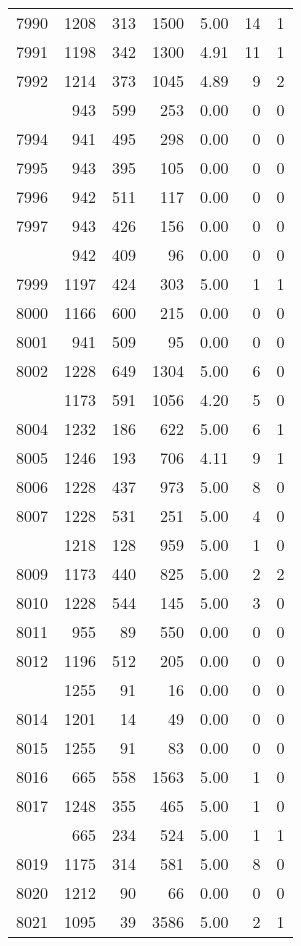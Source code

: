 \documentclass[
]{article}
\begin{document}
\begin{table}
\begin{tabular}[t]{lrrrrrr}
7990 & 1208 & 313 & 1500 & 5.00 & 14 & 1\\
7991 & 1198 & 342 & 1300 & 4.91 & 11 & 1\\
7992 & 1214 & 373 & 1045 & 4.89 & 9 & 2\\
\addlinespace
7993 & 943 & 599 & 253 & 0.00 & 0 & 0\\
7994 & 941 & 495 & 298 & 0.00 & 0 & 0\\
7995 & 943 & 395 & 105 & 0.00 & 0 & 0\\
7996 & 942 & 511 & 117 & 0.00 & 0 & 0\\
7997 & 943 & 426 & 156 & 0.00 & 0 & 0\\
\addlinespace
7998 & 942 & 409 & 96 & 0.00 & 0 & 0\\
7999 & 1197 & 424 & 303 & 5.00 & 1 & 1\\
8000 & 1166 & 600 & 215 & 0.00 & 0 & 0\\
8001 & 941 & 509 & 95 & 0.00 & 0 & 0\\
8002 & 1228 & 649 & 1304 & 5.00 & 6 & 0\\
\addlinespace
8003 & 1173 & 591 & 1056 & 4.20 & 5 & 0\\
8004 & 1232 & 186 & 622 & 5.00 & 6 & 1\\
8005 & 1246 & 193 & 706 & 4.11 & 9 & 1\\
8006 & 1228 & 437 & 973 & 5.00 & 8 & 0\\
8007 & 1228 & 531 & 251 & 5.00 & 4 & 0\\
\addlinespace
8008 & 1218 & 128 & 959 & 5.00 & 1 & 0\\
8009 & 1173 & 440 & 825 & 5.00 & 2 & 2\\
8010 & 1228 & 544 & 145 & 5.00 & 3 & 0\\
8011 & 955 & 89 & 550 & 0.00 & 0 & 0\\
8012 & 1196 & 512 & 205 & 0.00 & 0 & 0\\
\addlinespace
8013 & 1255 & 91 & 16 & 0.00 & 0 & 0\\
8014 & 1201 & 14 & 49 & 0.00 & 0 & 0\\
8015 & 1255 & 91 & 83 & 0.00 & 0 & 0\\
8016 & 665 & 558 & 1563 & 5.00 & 1 & 0\\
8017 & 1248 & 355 & 465 & 5.00 & 1 & 0\\
\addlinespace
8018 & 665 & 234 & 524 & 5.00 & 1 & 1\\
8019 & 1175 & 314 & 581 & 5.00 & 8 & 0\\
8020 & 1212 & 90 & 66 & 0.00 & 0 & 0\\
8021 & 1095 & 39 & 3586 & 5.00 & 2 & 1\\

\end{tabular}
\end{table}
\end{document}
